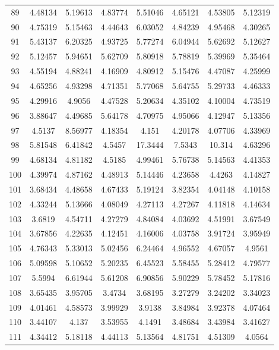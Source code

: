 \begin{center}
\begin{longtable}{cccccccc}
89 & 4.48134 & 5.19613 & 4.83774 & 5.51046 & 4.65121 & 4.53805 & 5.12319\\
90 & 4.75319 & 5.15463 & 4.44643 & 6.03052 & 4.84239 & 4.95468 & 4.30265\\
91 & 5.43137 & 6.20325 & 4.93725 & 5.77274 & 6.04944 & 5.62692 & 5.12627\\
92 & 5.12457 & 5.94651 & 5.62709 & 5.80918 & 5.78819 & 5.39969 & 5.35464\\
93 & 4.55194 & 4.88241 & 4.16909 & 4.80912 & 5.15476 & 4.47087 & 4.25999\\
94 & 4.65256 & 4.93298 & 4.71351 & 5.77068 & 5.64755 & 5.29733 & 4.46333\\
95 & 4.29916 & 4.9056 & 4.47528 & 5.20634 & 4.35102 & 4.10004 & 4.73519\\
96 & 3.88647 & 4.49685 & 5.64178 & 4.70975 & 4.95066 & 4.12947 & 5.13356\\
97 & 4.5137 & 8.56977 & 4.18354 & 4.151 & 4.20178 & 4.07706 & 4.33969\\
98 & 5.81548 & 6.41842 & 4.5457 & 17.3444 & 7.5343 & 10.314 & 4.63296\\
99 & 4.68134 & 4.81182 & 4.5185 & 4.99461 & 5.76738 & 5.14563 & 4.41353\\
100 & 4.39974 & 4.87162 & 4.48913 & 5.14446 & 4.23658 & 4.4263 & 4.14827\\
101 & 3.68434 & 4.48658 & 4.67433 & 5.19124 & 3.82354 & 4.04148 & 4.10158\\
102 & 4.33244 & 5.13666 & 4.08049 & 4.27113 & 4.27267 & 4.11818 & 4.14634\\
103 & 3.6819 & 4.54711 & 4.27279 & 4.84084 & 4.03692 & 4.51991 & 3.67549\\
104 & 3.67856 & 4.22635 & 4.12451 & 4.16006 & 4.03758 & 3.91724 & 3.95949\\
105 & 4.76343 & 5.33013 & 5.02456 & 6.24464 & 4.96552 & 4.67057 & 4.9561\\
106 & 5.09598 & 5.10652 & 5.20235 & 6.45523 & 5.58455 & 5.28412 & 4.79577\\
107 & 5.5994 & 6.61944 & 5.61208 & 6.90856 & 5.90229 & 5.78452 & 5.17816\\
108 & 3.65435 & 3.95705 & 3.4734 & 3.68195 & 3.27279 & 3.24202 & 3.34023\\
109 & 4.01461 & 4.58573 & 3.99929 & 3.9138 & 3.84984 & 3.92378 & 4.07464\\
110 & 3.44107 & 4.137 & 3.53955 & 4.1491 & 3.48684 & 3.43984 & 3.41627\\
111 & 4.34412 & 5.18118 & 4.44113 & 5.13564 & 4.81751 & 4.51309 & 4.0564\\

\end{longtable}
\end{center}

